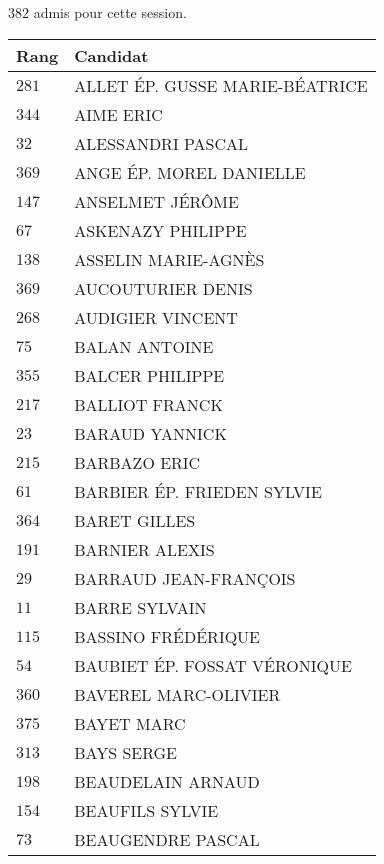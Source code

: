 



  $382$ admis pour cette session.

  \begin{xltabular}{\linewidth}{|l|X|}
    \hline
    \textbf{Rang} & \textbf{Candidat} \\
    \hline
    $281$ & ALLET ÉP. GUSSE MARIE-BÉATRICE \\
    \hline
    $344$ & AIME ERIC \\
    \hline
    $32$ & ALESSANDRI PASCAL \\
    \hline
    $369$ & ANGE ÉP. MOREL DANIELLE \\
    \hline
    $147$ & ANSELMET JÉRÔME \\
    \hline
    $67$ & ASKENAZY PHILIPPE \\
    \hline
    $138$ & ASSELIN MARIE-AGNÈS \\
    \hline
    $369$ & AUCOUTURIER DENIS \\
    \hline
    $268$ & AUDIGIER VINCENT \\
    \hline
    $75$ & BALAN ANTOINE \\
    \hline
    $355$ & BALCER PHILIPPE \\
    \hline
    $217$ & BALLIOT FRANCK \\
    \hline
    $23$ & BARAUD YANNICK \\
    \hline
    $215$ & BARBAZO ERIC \\
    \hline
    $61$ & BARBIER ÉP. FRIEDEN SYLVIE \\
    \hline
    $364$ & BARET GILLES \\
    \hline
    $191$ & BARNIER ALEXIS \\
    \hline
    $29$ & BARRAUD JEAN-FRANÇOIS \\
    \hline
    $11$ & BARRE SYLVAIN \\
    \hline
    $115$ & BASSINO FRÉDÉRIQUE \\
    \hline
    $54$ & BAUBIET ÉP. FOSSAT VÉRONIQUE \\
    \hline
    $360$ & BAVEREL MARC-OLIVIER \\
    \hline
    $375$ & BAYET MARC \\
    \hline
    $313$ & BAYS SERGE \\
    \hline
    $198$ & BEAUDELAIN ARNAUD \\
    \hline
    $154$ & BEAUFILS SYLVIE \\
    \hline
    $73$ & BEAUGENDRE PASCAL \\

\end{xltabular}
